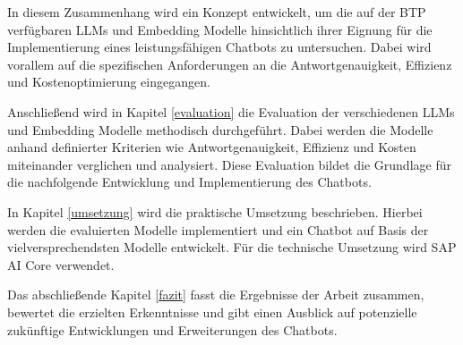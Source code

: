 In diesem Zusammenhang wird ein Konzept entwickelt, um die auf der \ac{BTP} verfügbaren \acp{LLM} und Embedding Modelle hinsichtlich ihrer Eignung für die Implementierung eines leistungsfähigen Chatbots zu untersuchen. Dabei wird vorallem auf die spezifischen 
Anforderungen an die Antwortgenauigkeit, Effizienz und Kostenoptimierung eingegangen.

Anschließend wird in Kapitel \ref{evaluation} die Evaluation der verschiedenen \acp{LLM} und Embedding Modelle methodisch durchgeführt. Dabei werden die Modelle anhand definierter Kriterien wie Antwortgenauigkeit, Effizienz und Kosten miteinander verglichen und analysiert. 
Diese Evaluation bildet die Grundlage für die nachfolgende Entwicklung und Implementierung des Chatbots.

In Kapitel \ref{umsetzung} wird die praktische Umsetzung beschrieben. Hierbei werden die evaluierten Modelle implementiert und ein Chatbot auf Basis der vielversprechendsten Modelle entwickelt.
Für die technische Umsetzung wird SAP AI Core verwendet.

Das abschließende Kapitel \ref{fazit} fasst die Ergebnisse der Arbeit zusammen, bewertet die erzielten Erkenntnisse und gibt einen Ausblick auf potenzielle zukünftige Entwicklungen und Erweiterungen des Chatbots.